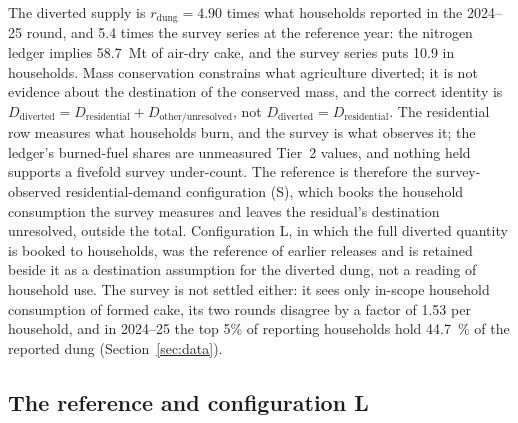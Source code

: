 The diverted supply is $r_{\text{dung}} = 4.90$ times what households reported in the
2024--25 round, and \num{5.4} times the survey series at the reference year: the nitrogen
ledger implies
\SI{58.7}{\mega\tonne} of air-dry cake, and the survey series puts \SI{10.9}{} in
households. Mass
conservation constrains what agriculture diverted; it is not evidence about the
destination of the conserved mass, and the correct identity is
$D_{\text{diverted}} = D_{\text{residential}} + D_{\text{other/unresolved}}$, not
$D_{\text{diverted}} = D_{\text{residential}}$. The residential row measures what
households burn, and the survey is what observes it; the ledger's burned-fuel shares are
unmeasured Tier~2 values, and nothing held supports a fivefold survey under-count. The
reference is therefore the survey-observed residential-demand configuration
(S), which books the household consumption the survey measures and leaves the
residual's destination unresolved, outside the total. Configuration L, in which the
full diverted quantity is booked to households, was the reference of earlier releases
and is retained beside it as a destination assumption for the diverted dung, not a
reading of household use. The survey is not settled either: it sees only in-scope
household consumption of formed cake, its two rounds disagree by a factor of
\num{1.53} per household, and in 2024--25 the top 5\% of reporting households hold
\SI{44.7}{\percent} of the reported dung (Section~\ref{sec:data}).

\subsection{The reference and configuration L}

